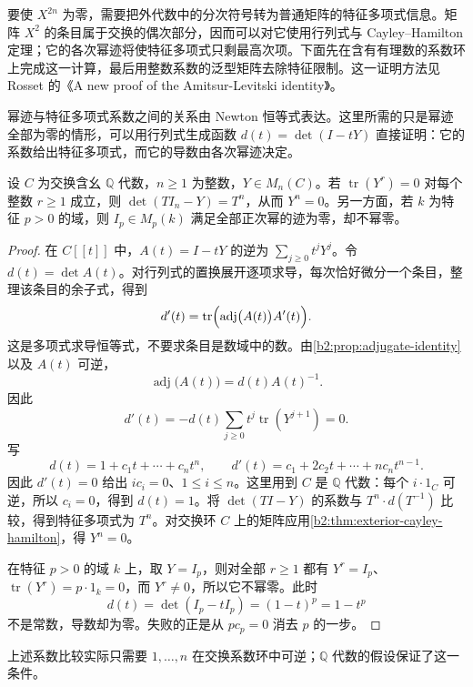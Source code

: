 \ProseParagraphBreak
要使 \(X^{2n}\) 为零，需要把外代数中的分次符号转为普通矩阵的特征多项式信息。矩阵 \(X^2\) 的条目属于交换的偶次部分，因而可以对它使用行列式与 Cayley–Hamilton 定理；它的各次幂迹将使特征多项式只剩最高次项。下面先在含有有理数的系数环上完成这一计算，最后用整数系数的泛型矩阵去除特征限制。这一证明方法见 Rosset 的《A new proof of the Amitsur-Levitski identity》\cite[pp.~187--188]{Rosset1976AmitsurLevitski}。

\ProseParagraphBreak
幂迹与特征多项式系数之间的关系由 Newton 恒等式表达。这里所需的只是幂迹全部为零的情形，可以用行列式生成函数 \(d(t)=\det(I-tY)\) 直接证明：它的系数给出特征多项式，而它的导数由各次幂迹决定。

\begin{lemma}\label{b2:lem:trace-zero-nilpotence}
	设 \(C\) 为交换含幺 \(\mathbb Q\) 代数，\(n\geq1\) 为整数，\(Y\in M_n(C)\)。若 \(\operatorname{tr}(Y^r)=0\) 对每个整数 \(r\geq1\) 成立，则 \(\det(TI_n-Y)=T^n\)，从而 \(Y^n=0\)。另一方面，若 \(k\) 为特征 \(p>0\) 的域，则 \(I_p\in M_p(k)\) 满足全部正次幂的迹为零，却不幂零。
\end{lemma}
\begin{proof}
	在 \(C[\![t]\!]\) 中，\(A(t)=I-tY\) 的逆为 \(\sum_{j\ge0}t^jY^j\)。令 \(d(t)=\det A(t)\)。对行列式的置换展开逐项求导，每次恰好微分一个条目，整理该条目的余子式，得到
	\[
		d'(t)=\operatorname{tr}\Bigl(\operatorname{adj}\bigl(A(t)\bigr)A'(t)\Bigr).
	\]
	这是多项式求导恒等式，不要求条目是数域中的数。由\cref{b2:prop:adjugate-identity}以及 \(A(t)\) 可逆，
	\[
		\operatorname{adj}\bigl(A(t)\bigr)=d(t)A(t)^{-1}.
	\]
	因此
	\[
		d'(t)=-d(t)\sum_{j\ge0}t^j\operatorname{tr}(Y^{j+1})=0.
	\]
	写
	\[
		d(t)=1+c_1t+\cdots+c_nt^n, \qquad d'(t)=c_1+2c_2t+\cdots+nc_nt^{n-1}.
	\]
	因此 \(d'(t)=0\) 给出 \(i c_i=0\)、\(1\le i\le n\)。这里用到 \(C\) 是 \(\mathbb Q\) 代数：每个 \(i\cdot1_C\) 可逆，所以 \(c_i=0\)，得到 \(d(t)=1\)。将 \(\det(TI-Y)\) 的系数与 \(T^n\cdot d(T^{-1})\) 比较，得到特征多项式为 \(T^n\)。对交换环 \(C\) 上的矩阵应用\cref{b2:thm:exterior-cayley-hamilton}，得 \(Y^n=0\)。

	在特征 \(p>0\) 的域 \(k\) 上，取 \(Y=I_p\)，则对全部 \(r\ge1\) 都有 \(Y^r=I_p\)、\(\operatorname{tr}(Y^r)=p\cdot1_k=0\)，而 \(Y^r\ne0\)，所以它不幂零。此时
	\[
		d(t)=\det(I_p-tI_p)=(1-t)^p=1-t^p
	\]
	不是常数，导数却为零。失败的正是从 \(p c_p=0\) 消去 \(p\) 的一步。
\end{proof}

上述系数比较实际只需要 \(1,\ldots,n\) 在交换系数环中可逆；\(\mathbb Q\) 代数的假设保证了这一条件。

